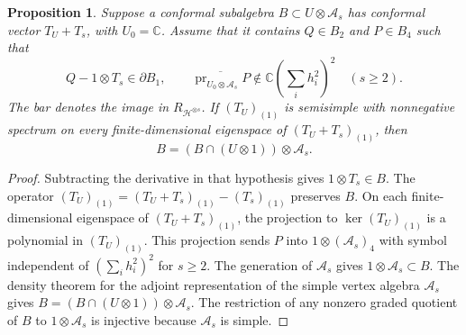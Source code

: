 \documentclass[11pt,a4paper]{amsart}
\numberwithin{equation}{section}
\newtheorem{proposition}[theorem]{Proposition}
\theoremstyle{definition}
\theoremstyle{remark}
\newcommand{\C}{\mathbb C}
\begin{document}
\begin{proposition}\label{seed:scalar-split}
Suppose a conformal subalgebra $B\subset U\otimes\mathcal A_s$
has conformal vector $T_U+T_s$, with $U_0=\C$. Assume that it contains
$Q\in B_2$ and $P\in B_4$ such that
$$
 Q-1\otimes T_s\in\partial B_1,\qquad
 \overline{\operatorname{pr}_{U_0\otimes\mathcal A_s}P}
 \notin\C(\textstyle\sum_i h_i^2)^2\quad(s\ge2).
$$
The bar denotes the image in $R_{\mathcal H^{\otimes s}}$.
If $(T_U)_{(1)}$ is semisimple with nonnegative spectrum on every
finite-dimensional eigenspace of $(T_U+T_s)_{(1)}$, then
$$
 B=(B\cap(U\otimes1))\otimes\mathcal A_s.
$$
\end{proposition}
\begin{proof}
Subtracting the derivative in that hypothesis gives $1\otimes T_s\in B$.
The operator $(T_U)_{(1)}=(T_U+T_s)_{(1)}-(T_s)_{(1)}$ preserves $B$.
On each finite-dimensional eigenspace of $(T_U+T_s)_{(1)}$, the
projection to $\ker(T_U)_{(1)}$ is a polynomial in $(T_U)_{(1)}$.
This projection sends $P$ into $1\otimes(\mathcal A_s)_4$ with
symbol independent of $(\sum_i h_i^2)^2$ for $s\ge2$.
The generation of $\mathcal A_s$ gives $1\otimes\mathcal A_s\subset B$.
The density theorem for the adjoint representation of the simple
vertex algebra $\mathcal A_s$ gives
$B=(B\cap(U\otimes1))\otimes\mathcal A_s$.
The restriction of any nonzero graded quotient of $B$ to
$1\otimes\mathcal A_s$ is injective because $\mathcal A_s$ is simple.
\end{proof}
\end{document}
